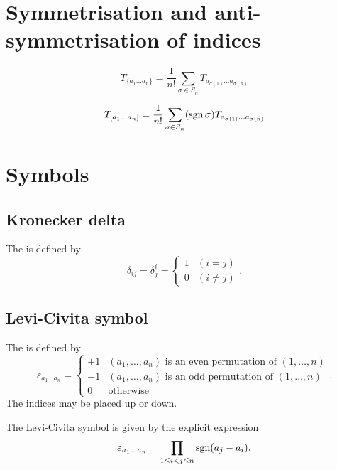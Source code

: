 \section{Symmetrisation and anti-symmetrisation of indices}

\[ T_{\{a_1\dots a_n\}} = \frac{1}{n!} \sum_{\sigma\in S_n} T_{a_{\sigma(1)} \dots a_{\sigma(n)}} \]

\[ T_{[a_1\dots a_n]} = \frac{1}{n!} \sum_{\sigma\in S_n} (\operatorname{sgn} \sigma)T_{a_{\sigma(1)} \dots a_{\sigma(n)}} \]
\section{Symbols}
\subsection{Kronecker delta}
\begin{definition}
The  is defined by
\[ \delta_{ij} = \delta^i_j = \begin{cases}
1 & (i=j) \\
0 & (i \neq j)
\end{cases}.\]
\end{definition}
\subsection{Levi-Civita symbol}
\begin{definition}
The  is defined by
\[ \varepsilon_{a_{1}\ldots a_{n}} = \begin{cases}
+1 & \text{$(a_{1},\ldots, a_{n})$ is an even permutation of $(1,\ldots, n)$} \\
-1 & \text{$(a_{1},\ldots, a_{n})$ is an odd permutation of $(1,\ldots, n)$} \\
0 & \text{otherwise}
\end{cases}.\]
The indices may be placed up or down.
\end{definition}

\begin{lemma} \label{LeviCivitaProduct}
The Levi-Civita symbol is given by the explicit expression
\[ \varepsilon_{a_{1}\ldots a_{n}} = \prod_{1\leq i<j\leq n}\operatorname{sgn}(a_j-a_i).\]
\end{lemma}

